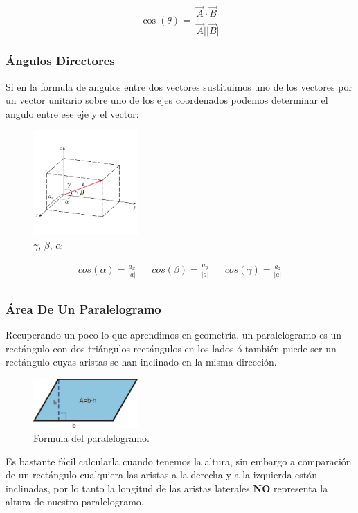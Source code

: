 \documentclass{article}
\begin{document}
\[
\cos(\theta) = \frac{ \vec{A} \cdot \vec{B} }{ \vert \vec{A} \vert \vert \vec{B} \vert }
\]

\subsubsection*{Ángulos Directores}
\label{sec:org3b4a822}
Si en la formula de angulos entre dos vectores sustituimos uno de los vectores por un vector unitario sobre uno de los ejes coordenados podemos determinar el angulo entre ese eje y el vector:

\begin{figure}[htbp]
\centering
\includegraphics[width=4cm]{img/angulos-directores.png}
\caption{\(\gamma\), \(\beta\), \(\alpha\)}
\end{figure}

\[\begin{aligned}
 cos(\alpha) = \frac{a_x}{|a|} && 
  cos(\beta) = \frac{a_y}{|a|} &&
 cos(\gamma) = \frac{a_z}{|a|} \\
\end{aligned}\] 

\subsubsection*{Área De Un Paralelogramo}
\label{sec:orgef5f288}
Recuperando un poco lo que aprendimos en geometría, un paralelogramo es un rectángulo con dos triángulos rectángulos en los lados ó también puede ser un rectángulo cuyas aristas se han inclinado en la misma dirección. 

\begin{figure}[htbp]
\centering
\includegraphics[width=4cm]{img/area-paralelogramo.png}
\caption{Formula del paralelogramo.}
\end{figure}

Es bastante fácil calcularla cuando tenemos la altura, sin embargo a comparación de un rectángulo cualquiera las aristas a la derecha y a la izquierda están inclinadas, por lo tanto la longitud de las aristas laterales \textbf{NO} representa la altura de nuestro paralelogramo.
\end{document}

